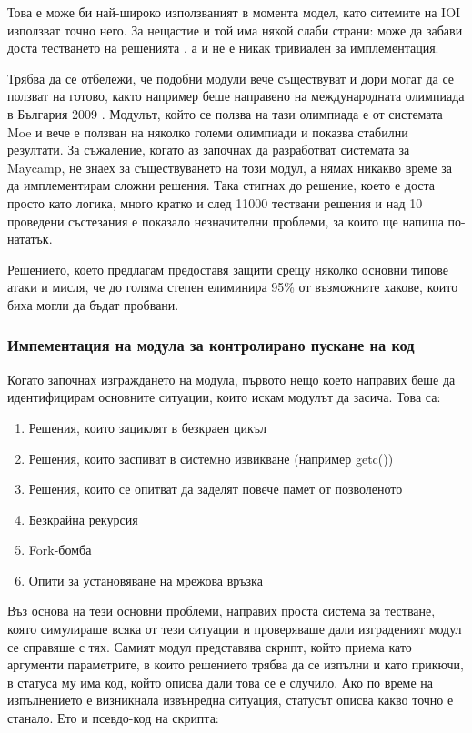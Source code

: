 \documentclass[a4paper,12pt]{article}
\begin{document}
  Това е може би най-широко използваният в момента модел, като ситемите на IOI използват точно него. За нещастие и той има някой слаби страни: може да забави доста тестването на решенията \cite{performance_reactive_tasks}, а и не е никак тривиален за имплементация.
  
  Трябва да се отбележи, че подобни модули вече съществуват и дори могат да се ползват на готово, както например беше направено на международната олимпиада в България 2009 \cite{validating_security}. Модулът, който се ползва на тази олимпиада е от системата Moe и вече е ползван на няколко големи олимпиади и показва стабилни резултати. За съжаление, когато аз започнах да разработват системата за Maycamp, не знаех за съществуването на този модул, а нямах никакво време за да имплементирам сложни решения. Така стигнах до решение, което е доста просто като логика, много кратко и след 11000 тествани решения и над 10 проведени състезания е показало незначителни проблеми, за които ще напиша по-нататък.
  
  Решението, което предлагам предоставя защити срещу няколко основни типове атаки и мисля, че до голяма степен елиминира 95\% от възможните хакове, които биха могли да бъдат пробвани.
  
  \subsubsection{Импементация на модула за контролирано пускане на код}
  Когато започнах изграждането на модула, първото нещо което направих беше да идентифицирам основните ситуации, които искам модулът да засича. Това са:
  
  \begin{enumerate}
    \item Решения, които зациклят в безкраен цикъл
    \item Решения, които заспиват в системно извикване (например getc())
    \item Решения, които се опитват да заделят повече памет от позволеното
    \item Безкрайна рекурсия
    \item Fork-бомба
    \item Опити за установяване на мрежова връзка
  \end{enumerate}
  
  Въз основа на тези основни проблеми, направих проста система за тестване, която симулираше всяка от тези ситуации и проверяваше дали изграденият модул се справяше с тях. Самият модул представява скрипт, който приема като аргументи параметрите, в които решението трябва да се изпълни и като прикючи, в статуса му има код, който описва дали това се е случило. Ако по време на изпълнението е визникнала извънредна ситуация, статусът описва какво точно е станало. Ето и псевдо-код на скрипта:
  
\end{document}
